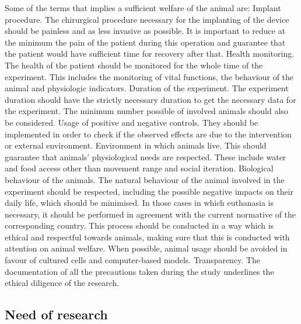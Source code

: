 \documentclass{Configuration_Files/PoliMi3i_thesis}
\begin{document}
Some of the terms that implies a sufficient welfare of the animal are:
Implant procedure. The chirurgical procedure necessary for the implanting of the device should be painless and as less invasive as possible. It is important to reduce at the minimum the pain of the patient during this operation and guarantee that the patient would have sufficient time for recovery after that. 
Health monitoring. The health of the patient should be monitored for the whole time of the experiment. This includes the monitoring of vital functions, the behaviour of the animal and physiologic indicators.
Duration of the experiment. The experiment duration should have the strictly necessary duration to get the necessary data for the experiment. The minimum number possible of involved animals should also be considered.
Usage of positive and negative controls. They should be implemented in order to check if the observed effects are due to the intervention or external environment.
Environment in which animals live. This should guarantee that animals' physiological needs are respected. These include water and food access other than movement range and social iteration.
Biological behaviour of the animals. The natural behaviour of the animal involved in the experiment should be respected, including the possible negative impacts on their daily life, which should be minimised.
In those cases in which euthanasia is necessary, it should be performed in agreement with the current normative of the corresponding country. This process should be conducted in a way which is ethical and respectful towards animals, making sure that this is conducted with attention on animal welfare. 
When possible, animal usage should be avoided in favour of cultured cells and computer-based models.
Transparency. The documentation of all the precautions taken during the study underlines the ethical diligence of the research.





\subsection{Need of research}
\end{document}
